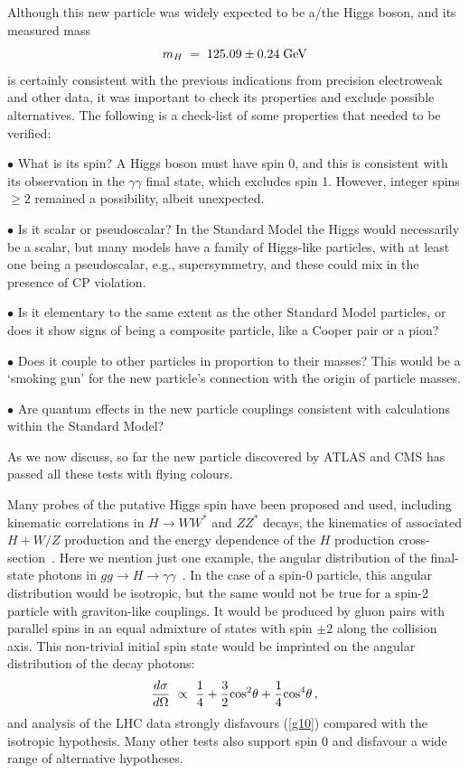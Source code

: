 \documentclass[12pt]{article}
\newcommand{\beq}{\begin{equation}}
\newcommand{\eeq}{\end{equation}}
\numberwithin{equation}{section}
\begin{document}
Although this new particle was widely expected to be a/the Higgs boson, and its measured
mass~\cite{MHjoint}
\beq
m_H \; = \; 125.09 \pm 0.24 \; {\rm GeV}
\label{measuredmH}
\eeq
is certainly consistent with the previous indications from precision electroweak and other
 data, it was important
to check its properties and exclude possible alternatives. The following is a check-list
of some properties that needed to be verified:

$\bullet$ What is its spin? A Higgs boson must have spin 0, and this is consistent with
its observation in the $\gamma \gamma$ final state, which excludes spin 1. However,
integer spins $\ge 2$ remained a possibility, albeit unexpected.

$\bullet$ Is it scalar or pseudoscalar? In the Standard Model the Higgs would necessarily
be a scalar, but many models have a family of Higgs-like particles, with at least one being
a pseudoscalar, e.g., supersymmetry, and these could mix in the presence of CP violation.

$\bullet$ Is it elementary to the same extent as the other Standard Model particles, or
does it show signs of being a composite particle, like a Cooper pair or a pion?

$\bullet$ Does it couple to other particles in proportion to their masses? This would be 
a `smoking gun' for the new particle's connection with the origin of particle masses.

$\bullet$ Are quantum effects in the new particle couplings consistent with calculations
within the Standard Model?

As we now discuss, so far the new particle discovered by ATLAS and CMS has passed
all these tests with flying colours.

Many probes of the putative Higgs spin have been proposed and used, including kinematic correlations
in $H \to W W^*$ and $Z Z^*$ decays, the kinematics of associated $H + W/Z$ production and the
energy dependence of the $H$ production cross-section~\cite{ATLASHspin,CMSHspin,TevatronHspin}. Here we mention just one example, the
angular distribution of the final-state photons in $gg \to H \to \gamma \gamma$~\cite{Hspin}. In the case of a spin-0
particle, this angular distribution would be isotropic, but the same would not be true for a spin-2 particle
with graviton-like couplings. It would be produced by gluon pairs with parallel spins in an equal admixture
of states with spin $\pm 2$ along the collision axis. This non-trivial initial spin state would be imprinted
on the angular distribution of the decay photons:
\begin{equation}
\frac{d\sigma}{d\Omega}\ \propto\ \frac{1}{4} + \frac{3}{2}{\rm cos}^2{\theta}
+ \frac{1}{4}{\rm cos}^4{\theta} \, ,
\label{g10}
\end{equation}
and analysis of the LHC data strongly disfavours (\ref{g10}) compared with the isotropic hypothesis.
Many other tests also support spin 0 and disfavour a wide range of alternative hypotheses.
\end{document}
